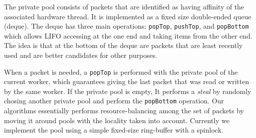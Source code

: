 The private pool consists of packets that are identified as having affinity of
the associated hardware thread. It is implemented as a fixed size double-ended
queue (deque). The deque has three main operations: \texttt{popTop},
\texttt{pushTop}, and \texttt{popBottom} which allows LIFO accessing at the one
end and taking items from the other end. The idea is that at the bottom of the
deque are packets that are least recently used and are better candidates for
other purposes. 

When a packet is needed, a \texttt{popTop} is performed with the private pool
of the current worker, which guarantees giving the last packet that was read or
written by the same worker. If the private pool is empty, It performs a
\textit{steal} by randomly chosing another private pool and perform the
\texttt{popBottom} operation. Our algorithms essentially performs
resource-balancing among the set of packets by moving it around pools with the
locality taken into account. Currently we implement the pool using a simple
fixed-size ring-buffer with a spinlock.
